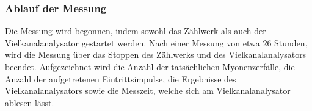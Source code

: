 \subsubsection{Ablauf der Messung}
Die Messung wird begonnen, indem sowohl das Zählwerk als auch der Vielkanalanalysator gestartet werden.
Nach einer Messung von etwa $26$ Stunden, wird die Messung über das Stoppen des Zählwerks und des Vielkanalanalysators beendet.
Aufgezeichnet wird die Anzahl der tatsächlichen Myonenzerfälle, die Anzahl der aufgetretenen Eintrittsimpulse, die Ergebnisse des Vielkanalanalysators sowie die Messzeit, welche sich am Vielkanalanalysator ablesen lässt.

